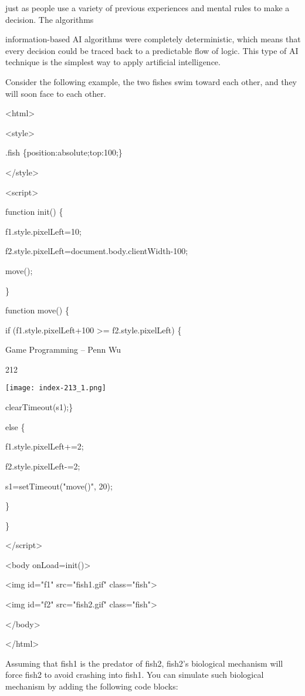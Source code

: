 \documentclass[
]{article}
\begin{document}
just as people use a variety of previous experiences and mental rules to
make a decision. The algorithms

information-based AI algorithms were completely deterministic, which
means that every decision could be traced back to a predictable flow of
logic. This type of AI technique is the simplest way to apply artificial
intelligence.

Consider the following example, the two fishes swim toward each other,
and they will soon face to each other.

\textless html\textgreater{}

\textless style\textgreater{}

.fish \{position:absolute;top:100;\}

\textless/style\textgreater{}

\textless script\textgreater{}

function init() \{

f1.style.pixelLeft=10;

f2.style.pixelLeft=document.body.clientWidth-100;

move();

\}

function move() \{

if (f1.style.pixelLeft+100 \textgreater= f2.style.pixelLeft) \{

Game Programming -- Penn Wu

212

\protect\hypertarget{index_split_011.htmlux5cux23p213}{}{}\texttt{[image: index-213\_1.png]}

clearTimeout(s1);\}

else \{

f1.style.pixelLeft+=2;

f2.style.pixelLeft-=2;

s1=setTimeout("move()", 20);

\}

\}

\textless/script\textgreater{}

\textless body onLoad=init()\textgreater{}

\textless img id="f1" src="fish1.gif" class="fish"\textgreater{}

\textless img id="f2" src="fish2.gif" class="fish"\textgreater{}

\textless/body\textgreater{}

\textless/html\textgreater{}

Assuming that fish1 is the predator of fish2, fish2's biological
mechanism will force fish2 to avoid crashing into fish1. You can
simulate such biological mechanism by adding the following code blocks:
\end{document}
